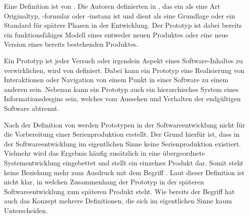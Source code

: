 Eine Definition ist von \citeauthor{Arnowitz.2007}. Die Autoren definierten in  \cite{Arnowitz.2007}, das ein  als eine Art Originaltyp, -formular oder -instanz ist und dient als eine Grundlage oder ein Standard für spätere Phasen in der Entwicklung. Der Prototyp ist dabei bereits ein funktionsfähiges Modell eines entweder neuen Produktes oder eine neue Version eines bereits bestehenden Produktes. 


Ein Prototyp ist jeder Versuch oder irgendein Aspekt eines Software-Inhaltes zu verwirklichen, wird von \citeauthor{Arnowitz.2007} definiert. Dabei kann ein Prototyp eine Realisierung von Interaktionen oder Navigation von einem Punkt in einer Software zu einem anderen sein. Nebenan kann ein Prototyp auch ein hierarchisches System eines Informationsdesgins sein, welches vom Aussehen und Verhalten der endgültigen Software abtrennt.


Nach der Definition von \citeauthor{Bleek.2002} werden Prototypen in der Softwareentwicklung nicht für die Vorbereitung einer Serienproduktion erstellt. Der Grund hierfür ist, dass in der Softwareentwicklung im eigentlichen Sinne keine Serienproduktion existiert. Vielmehr wird das Ergebnis häufig zusätzlich in eine übergeordnete Systementwicklung eingebettet und stellt ein einzelnes Produkt dar. Somit steht keine Beziehung mehr zum Ausdruck  mit dem Begriff . 
Laut dieser Definition ist nicht klar, in welchen Zusammenhang der Prototyp in der späteren Softwareentwicklung zum späteren Produkt steht. 
Wie bereits der Begriff  hat auch das Konzept  mehrere Definitionen, die sich im eigentlichen Sinne kaum Unterscheiden.


